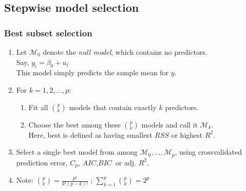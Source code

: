\documentclass{beamer}
\begin{document}
\subsection{Stepwise model selection}
\begin{frame}
\frametitle{Best subset selection}

\begin{enumerate}
  \item Let $\mathcal{M}_0$ denote the \textit{null model}, which contains no predictors.
  \\Say, $y_i=\beta_0+u_i$
  \\ This model simply predicts the sample mean for $y$.
  \item For $k= 1,2, \dots ,p$:
  \begin{enumerate}[{(a)}]
  \item Fit all $\binom{p}{k}$ models that contain exactly $k$ predictors.
  \item Choose the best among these $\binom{p}{k}$ models and call it $\mathcal{M}_{k}$.
        \\Here, best is defined as having smallest $\textit{RSS}$ or highest $R^2$.
\end{enumerate}
  \item Select a single best model from among $\mathcal{M}_0, \dots, \mathcal{M}_{p}$, using crossvalidated prediction error, $C_p$, $\textit{AIC}, \textit{BIC}$ or adj. $R^2$.

\vspace{0.8cm}

\item[] Note: $\binom{p}{k}=\frac{p!}{k!(p-k)!}$ \hspace{0.5cm}; \hspace{0.5cm} $\sum_{k=1}^p \binom{p}{k} = 2^p$

\end{enumerate}
\end{frame}
\end{document}
